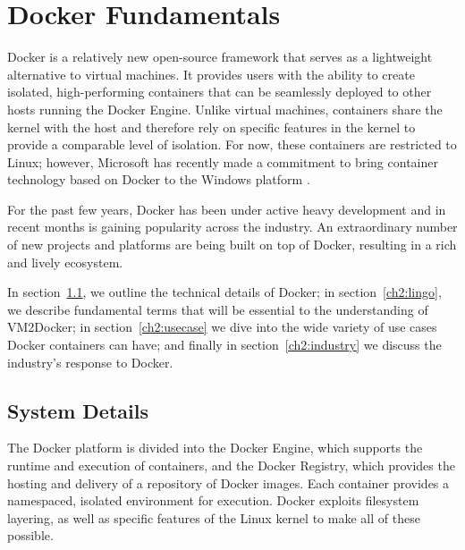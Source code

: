 \chapter{Docker Fundamentals}
\label{chap:docker}

Docker is a relatively new open-source framework that serves as a lightweight alternative to virtual machines. It provides users with the ability to create isolated, high-performing containers that can be seamlessly deployed to other hosts running the Docker Engine. Unlike virtual machines, containers share the kernel with the host and therefore rely on specific features in the kernel to provide a comparable level of isolation. For now, these containers are restricted to Linux; however, Microsoft has recently made a commitment to bring container technology based on Docker to the Windows platform \cite{windows-docker}.

For the past few years, Docker has been under active heavy development and in recent months is gaining popularity across the industry. An extraordinary number of new projects and platforms are being built on top of Docker, resulting in a rich and lively ecosystem. 


In section~\ref{ch2:system}, we outline the technical details of Docker; in section~\ref{ch2:lingo}, we describe fundamental terms that will be essential to the understanding of VM2Docker; in section~\ref{ch2:usecase} we dive into the wide variety of use cases Docker containers can have; and finally in section~\ref{ch2:industry} we discuss the industry's response to Docker.

\section{System Details}\label{ch2:system}
The Docker platform is divided into the Docker Engine, which supports the runtime and execution of containers, and the Docker Registry, which provides the hosting and delivery of a repository of Docker images. Each container provides a namespaced, isolated environment for execution. Docker exploits filesystem layering, as well as specific features of the Linux kernel to make all of these possible.

